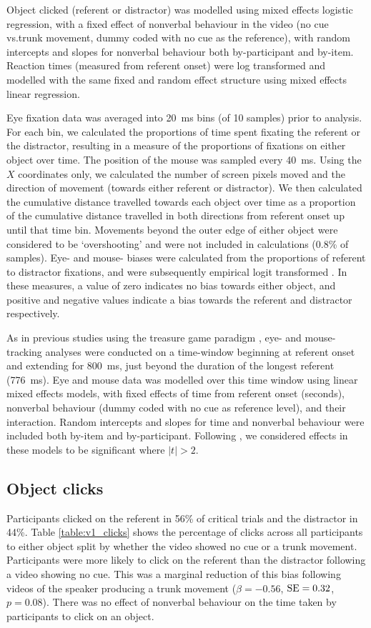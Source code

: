 \documentclass[a4paper,man,natbib]{apa6}
\newcommand{\resultsLog}[3]{$\beta = #1$, $\textnormal{SE} = #2$, $p #3$}
\begin{document}
Object clicked (referent or distractor) was modelled using mixed effects logistic regression, with a fixed effect of nonverbal behaviour in the video (no cue vs.\@ trunk movement, dummy coded with no cue as the reference), with random intercepts and slopes for nonverbal behaviour both by-participant and by-item.
Reaction times (measured from referent onset) were log transformed and modelled with the same fixed and random effect structure using mixed effects linear regression.

Eye fixation data was averaged into 20~ms bins (of 10 samples) prior to analysis.
For each bin, we calculated the proportions of time spent fixating the referent or the distractor, resulting in a measure of the proportions of fixations on either object over time.
The position of the mouse was sampled every 40~ms.
Using the $X$ coordinates only, we calculated the number of screen pixels moved and the direction of movement (towards either referent or distractor).
We then calculated the cumulative distance travelled towards each object over time as a proportion of the cumulative distance travelled in both directions from referent onset up until that time bin.
Movements beyond the outer edge of either object were considered to be `overshooting' and were not included in calculations (0.8\% of samples).
Eye- and mouse- biases were calculated from the proportions of referent to distractor fixations, and were subsequently empirical logit transformed \citep{Barr2008}. 
In these measures, a value of zero indicates no bias towards either object, and positive and negative values indicate a bias towards the referent and distractor respectively.

As in previous studies using the treasure game paradigm \citep{King2018,Loy2017}, eye- and mouse- tracking analyses were conducted on a time-window beginning at referent onset and extending for 800~ms, just beyond the duration of the longest referent (776~ms).
Eye and mouse data was modelled over this time window using linear mixed effects models, with fixed effects of time from referent onset (seconds), nonverbal behaviour (dummy coded with no cue as reference level), and their interaction.
Random intercepts and slopes for time and nonverbal behaviour were included both by-item and by-participant.
Following \citet{Baayen2008}, we considered effects in these models to be significant where $|t|>2$.

\subsection{Object clicks}
Participants clicked on the referent in 56\% of critical trials and the distractor in 44\%.
Table \ref{table:v1_clicks} shows the percentage of clicks across all participants to either object split by whether the video showed no cue or a trunk movement.
Participants were more likely to click on the referent than the distractor following a video showing no cue. 
This was a marginal reduction of this bias following videos of the speaker producing a trunk movement (\resultsLog{-0.56}{0.32}{=0.08}).
There was no effect of nonverbal behaviour on the time taken by participants to click on an object.
\end{document}
